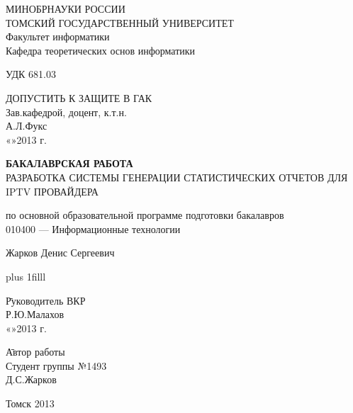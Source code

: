 \large
\thispagestyle{empty}
\begin{center}
МИНОБРНАУКИ РОССИИ\\
ТОМСКИЙ ГОСУДАРСТВЕННЫЙ УНИВЕРСИТЕТ\\
Факультет информатики\\
Кафедра теоретических основ информатики\\
\end{center}

УДК 681.03

\vspace{0.5cm}

\begin{flushright}
ДОПУСТИТЬ К ЗАЩИТЕ В ГАК\\
Зав.кафедрой, доцент, к.т.н.\\
\makebox[3cm]{\hrulefill}А.Л.Фукс\\
«\makebox[0.8cm]{\hrulefill}»\makebox[1.5cm]{\hrulefill}2013 г.\\
\end{flushright}



\begin{center}

\vspace{1.5cm}
{\bf БАКАЛАВРСКАЯ РАБОТА}\\
\vspace{0.5cm}
РАЗРАБОТКА СИСТЕМЫ ГЕНЕРАЦИИ СТАТИСТИЧЕСКИХ ОТЧЕТОВ ДЛЯ IPTV ПРОВАЙДЕРА

\vspace{0.5cm}
по основной образовательной программе подготовки бакалавров\\
010400 --- Информационные технологии

\vspace{0.5cm}

Жарков Денис Сергеевич


\end{center}

\vskip 0pt plus 1filll

\begin{tabbing}
\hspace{10cm}\=Руководитель ВКР\\
\>\makebox[3cm]{\hrulefill}Р.Ю.Малахов\\
\>«\makebox[0.8cm]{\hrulefill}»\makebox[1.5cm]{\hrulefill}2013 г.\\
\end{tabbing}

\begin{tabbing}
\hspace{10cm}\=Автор работы\\
\>Студент группы №1493\\
\>\makebox[3cm]{\hrulefill}Д.С.Жарков\\
\end{tabbing}

\vspace*{1cm}

\begin{center}
Томск 2013
\end{center}
\normalsize
